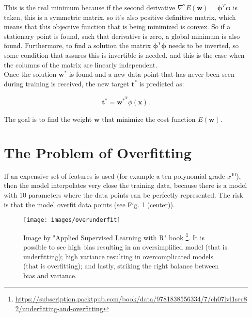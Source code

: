 \noindent This is the real minimum because if the second derivative $\nabla^2 E(\bm{w}) = \bm{\phi}^T \bm{\phi}$ is taken, this is a symmetric matrix, so it's also positive definitive matrix, which means that this objective function that is being minimized is convex. So if a stationary point is found, such that derivative is zero, a global minimum is also found. Furthermore, to find a solution the matrix $\bm{\phi}^T \bm{\phi}$ needs to be inverted, so some condition that assures this is invertible is needed, and this is the case when the columns of the matrix are linearly independent. \\

\noindent Once the solution $\bm{w^*}$ is found and a new data point that has never been seen during training is received, the new target $\bm{t^*}$ is predicted as:

\begin{Equation}[H]
	\centering
	\begin{equation} \label{eq:soloptridgereg}
		\begin{aligned}
			\bm{t^*} = \bm{w^{*^T}} \phi(\bm{x}).
		\end{aligned}
	\end{equation}
	\caption[Prediction in ridge regression.]{The goal is to find the weight $\bm{w}$ that minimize the cost function $E(\bm{w})$.}
\end{Equation}

\section{The Problem of Overfitting}
\label{subsec:poverfitting}
If an expensive set of features is used (for example a ten polynomial grade $x^{10}$), then the model interpolates very close the training data, because there is a model with $10$ parameters where the data points can be perfectly represented. The risk is that the model overfit data points (see Fig. \ref{fig:overunderfit} (center)).

\begin{figure}[H]
	\begin{minipage}{\textwidth}
		\centering
		\texttt{[image: images/overunderfit]}
		\caption[Overfitting and Underfitting.]{Image by "Applied Supervised Learning with R" book \footnote{\url{https://subscription.packtpub.com/book/data/9781838556334/7/ch07lvl1sec82/underfitting-and-overfitting}}. It is possible to see high bias resulting in an oversimplified model (that is underfitting); high variance resulting in overcomplicated models (that is overfitting); and lastly, striking the right balance between bias and variance.}
		\label{fig:overunderfit}
	\end{minipage}
\end{figure}

